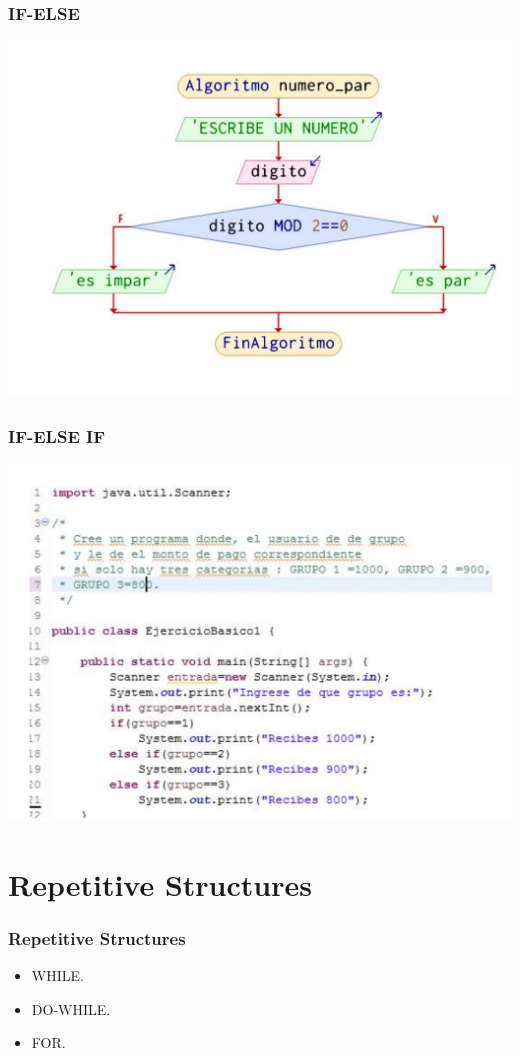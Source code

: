 \documentclass[11pt]{beamer}
\begin{document}
\begin{frame}
\frametitle{IF-ELSE}
\begin{center}
\includegraphics[scale=0.29]{figuras/if.pdf}
\end{center}
\end{frame}

\begin{frame}
\frametitle{IF-ELSE IF}
\begin{center}
\includegraphics[scale=0.35]{figuras/if_else.pdf}
\end{center}
\end{frame}

\section{Repetitive Structures}
\begin{frame}
\frametitle{Repetitive Structures}
\begin{itemize}
\item WHILE.
\item DO-WHILE.
\item FOR.
\end{itemize}
\end{frame}
\end{document}
